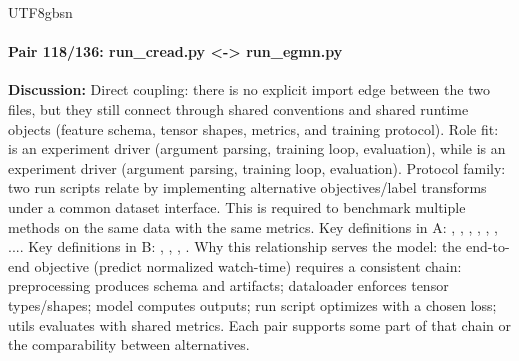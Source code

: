 \documentclass[11pt]{article}
\begin{document}
\begin{CJK*}{UTF8}{gbsn}
\paragraph{Pair 118/136: run\_cread.py <-> run\_egmn.py}
\textbf{Discussion:} Direct coupling: there is no explicit import edge between the two files, but they still connect through shared conventions and shared runtime objects (feature schema, tensor shapes, metrics, and training protocol). Role fit: \texttt{} is an experiment driver (argument parsing, training loop, evaluation), while \texttt{} is an experiment driver (argument parsing, training loop, evaluation). Protocol family: two run scripts relate by implementing alternative objectives/label transforms under a common dataset interface. This is required to benchmark multiple methods on the same data with the same metrics. Key definitions in A: \texttt{}, \texttt{}, \texttt{}, \texttt{}, \texttt{}, \texttt{}, .... Key definitions in B: \texttt{}, \texttt{}, \texttt{}, \texttt{}. Why this relationship serves the model: the end-to-end objective (predict normalized watch-time) requires a consistent chain: preprocessing produces schema and artifacts; dataloader enforces tensor types/shapes; model computes outputs; run script optimizes with a chosen loss; utils evaluates with shared metrics. Each pair supports some part of that chain or the comparability between alternatives.


\end{CJK*}
\end{document}
